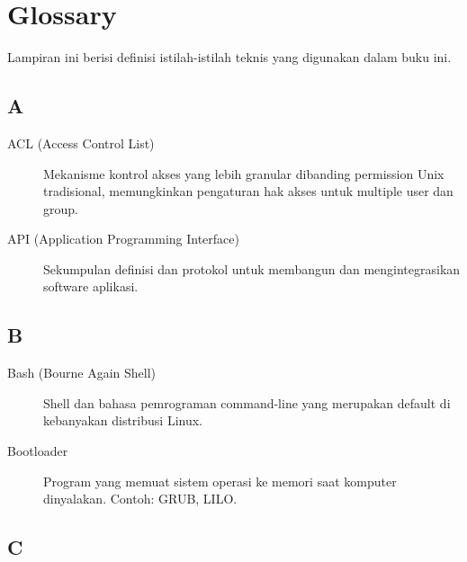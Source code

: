 
\chapter{Glossary}
\label{app:glossary}

Lampiran ini berisi definisi istilah-istilah teknis yang digunakan dalam buku ini.

\section*{A}

\begin{description}
    \item[ACL (Access Control List)] Mekanisme kontrol akses yang lebih granular
          dibanding permission Unix tradisional, memungkinkan pengaturan hak akses
          untuk multiple user dan group.

    \item[API (Application Programming Interface)] Sekumpulan definisi dan protokol
          untuk membangun dan mengintegrasikan software aplikasi.
\end{description}

\section*{B}

\begin{description}
    \item[Bash (Bourne Again Shell)] Shell dan bahasa pemrograman command-line
          yang merupakan default di kebanyakan distribusi Linux.

    \item[Bootloader] Program yang memuat sistem operasi ke memori saat komputer
          dinyalakan. Contoh: GRUB, LILO.
\end{description}

\section*{C}

